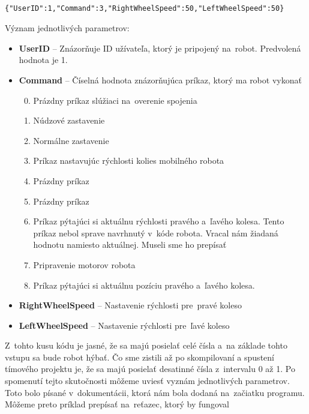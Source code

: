\label{jsonSpeedRequestBad}
\begin{lstlisting}
		{"UserID":1,"Command":3,"RightWheelSpeed":50,"LeftWheelSpeed":50}
\end{lstlisting}

\newpage

\noindent Význam jednotlivých parametrov:
\begin{itemize}
	\item \textbf{UserID} -- Znázorňuje ID užívateľa, ktorý je pripojený na~robot. Predvolená hodnota je 1.
	\item \textbf{Command} --  Číselná hodnota znázorňujúca príkaz, ktorý ma robot vykonať
		\begin{enumerate}
			\setcounter{enumi}{-1}
			\item \label{c0} Prázdny príkaz slúžiaci na~overenie spojenia
			\item \label{c1} Núdzové zastavenie
			\item \label{c2} Normálne zastavenie
			\item \label{c3} Príkaz nastavujúc rýchlosti kolies mobilného robota
			\item \label{c4} Prázdny príkaz
			\item \label{c5} Prázdny príkaz
			\item \label{c6} Príkaz pýtajúci si aktuálnu rýchlosti pravého a~ľavého kolesa. Tento príkaz nebol sprave navrhnutý v~kóde robota. Vracal nám žiadaná hodnotu
				namiesto aktuálnej. Museli sme ho prepísať
			\item \label{c7} Pripravenie motorov robota
			\item \label{c8} Príkaz pýtajúci si aktuálnu pozíciu pravého a~ľavého kolesa.
		\end{enumerate}
	\item \textbf{RightWheelSpeed} -- Nastavenie rýchlosti pre~pravé koleso
	\item \textbf{LeftWheelSpeed} -- Nastavenie rýchlosti pre~ľavé koleso
\end{itemize}

\noindent Z~tohto kusu kódu je jasné, že sa majú posielať celé čísla a~na základe tohto vstupu sa bude robot hýbať. Čo sme zistili až po skompilovaní
a spustení tímového projektu je, že sa majú posielať desatinné čísla z~intervalu 0 až 1. Po spomenutí tejto skutočnosti môžeme uviesť vyznám jednotlivých parametrov.
Toto bolo písané v~dokumentácii, ktorá nám bola dodaná na~začiatku programu. Môžeme preto príklad prepísať na~reťazec, ktorý by fungoval

